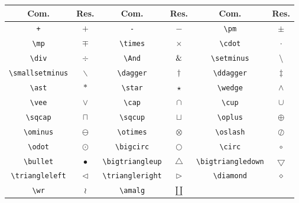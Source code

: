 % 
% 
% 
% 
% 
\begin{tabular}{cc|cc|cc}
    \hline
    Com. & Res. & Com. & Res. & Com. & Res. \\ \hline
    \lstinline!+! & $+$ & \lstinline!-! & $-$ & \lstinline!\pm! & $\pm$ \\
    \lstinline!\mp! & $\mp$ & \lstinline!\times! & $\times$ & \lstinline!\cdot! & $\cdot$ \\
    \lstinline!\div! & $\div$ & \lstinline!\And! & $\And$ & \lstinline!\setminus! & $\setminus$ \\
    \lstinline!\smallsetminus! & $\smallsetminus$ & \lstinline!\dagger! & $\dagger$ & \lstinline!\ddagger! & $\ddagger$ \\
    \lstinline!\ast! & $\ast$ & \lstinline!\star! & $\star$ & \lstinline!\wedge! & $\wedge$ \\
    \lstinline!\vee! & $\vee$ & \lstinline!\cap! & $\cap$ & \lstinline!\cup! & $\cup$ \\
    \lstinline!\sqcap! & $\sqcap$ & \lstinline!\sqcup! & $\sqcup$ & \lstinline!\oplus! & $\oplus$ \\
    \lstinline!\ominus! & $\ominus$ & \lstinline!\otimes! & $\otimes$ & \lstinline!\oslash! & $\oslash$ \\
    \lstinline!\odot! & $\odot$ & \lstinline!\bigcirc! & $\bigcirc$ & \lstinline!\circ! & $\circ$ \\
    \lstinline!\bullet! & $\bullet$ & \lstinline!\bigtriangleup! & $\bigtriangleup$ & \lstinline!\bigtriangledown! & $\bigtriangledown$ \\
    \lstinline!\triangleleft! & $\triangleleft$ & \lstinline!\triangleright! & $\triangleright$ &\lstinline!\diamond! & $\diamond$ \\
    \lstinline!\wr! & $\wr$ & \lstinline!\amalg! & $\amalg$ \\ \hline
\end{tabular}
